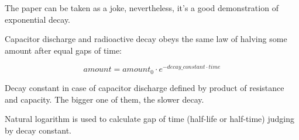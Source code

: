 The paper can be taken as a joke, nevertheless, it's a good demonstration of exponential decay.


Capacitor discharge and radioactive decay obeys the same law of halving some amount after equal gaps of time:

\[
amount=amount_{0} \cdot e^{- decay\_constant \cdot time}
\]

Decay constant in case of capacitor discharge defined by product of resistance and capacity.
The bigger one of them, the slower decay.

Natural logarithm is used to calculate gap of time (half-life or half-time) judging by decay constant.

\levelup{}

\levelup{}

